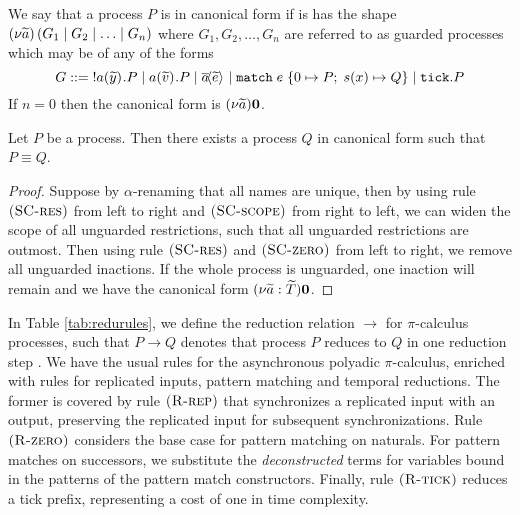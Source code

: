 %
\begin{defi}
We say that a process $P$ is in canonical form if is has the shape $\newvar{\widetilde{a}}{\left(\parcomp{G_1}{\parcomp{G_2}{\parcomp{\dots}{G_n}}}\right)}$
 where $G_1,G_2,\dots,G_n$ are referred to as guarded processes which may be of any of the forms
\begin{equation*}
    G ::=\; ! a(\widetilde{y})^{}.P \mid a(\widetilde{v})^{}.P \mid \overline{a}\!\langle \widetilde{e}\rangle^{} \mid \texttt{match}\; e\; \{ 0 \mapsto P;\; s(x) \mapsto Q \} \mid \texttt{tick}.P
\end{equation*}
If $n = 0$ then the canonical form is $(\nu \widetilde{a}) \mathbf{0}$.
\label{def:canonform1}
\end{defi}
%
\begin{lemma}\label{lemma:cannform}
Let $P$ be a process. Then there exists a process $Q$ in canonical form such that $P \equiv Q$.
\begin{proof}
Suppose by $\alpha$-renaming that all names are unique, then by using rule $\mbox{\textsc{\protect{(SC-res})}}$ from left to right and $\mbox{\textsc{\protect{(SC-scope})}}$ from right to left, we can widen the scope of all unguarded restrictions, such that all unguarded restrictions are outmost. Then using rule $\mbox{\textsc{\protect{(SC-res})}}$ and $\mbox{\textsc{\protect{(SC-zero})}}$ from left to right, we remove all unguarded inactions. If the whole process is unguarded, one inaction will remain and we have the canonical form $(\nu \widetilde{a} : \widetilde{T}) \mathbf{0}$.
\end{proof}
\end{lemma}
%
In Table \ref{tab:redurules}, we define the reduction relation $\longrightarrow$ for $\pi$-calculus processes, such that $P \longrightarrow Q$ denotes that process $P$ reduces to $Q$ in one reduction step \cite{Milner1993}. We have the usual rules for the asynchronous polyadic $\pi$-calculus, enriched with rules for replicated inputs, pattern matching and temporal reductions. The former is covered by rule $\mbox{\textsc{\protect{(R-rep})}}$ that synchronizes a replicated input with an output, preserving the replicated input for subsequent synchronizations. Rule $\mbox{\textsc{\protect{(R-zero})}}$ considers the base case for pattern matching on naturals. For pattern matches on successors, we substitute the \textit{deconstructed} terms for variables bound in the patterns of the pattern match constructors. Finally, rule $\mbox{\textsc{\protect{(R-tick})}}$ reduces a tick prefix, representing a cost of one in time complexity.
%
